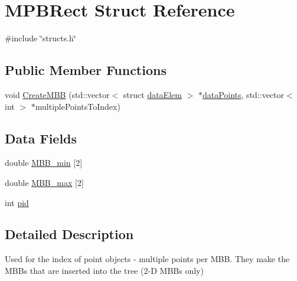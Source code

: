 \hypertarget{structMPBRect}{\section{M\-P\-B\-Rect Struct Reference}
\label{structMPBRect}
}


{\ttfamily \#include \char`\"{}structs.\-h\char`\"{}}

\subsection*{Public Member Functions}
\begin{DoxyCompactItemize}
\item 
void \hyperlink{structMPBRect_a033ab3752f265ead9537a7de070e074a}{Create\-M\-B\-B} (std\-::vector$<$ struct \hyperlink{structdataElem}{data\-Elem} $>$ $\ast$\hyperlink{globals_8h_ac152ac2be0eb07c2b73b4bb54a8f1952}{data\-Points}, std\-::vector$<$ int $>$ $\ast$multiple\-Points\-To\-Index)
\end{DoxyCompactItemize}
\subsection*{Data Fields}
\begin{DoxyCompactItemize}
\item 
double \hyperlink{structMPBRect_a87b98ecee53f4258063d5ba19fe04cad}{M\-B\-B\-\_\-min} \mbox{[}2\mbox{]}
\item 
double \hyperlink{structMPBRect_a1635c4ed1a66979dc1c0422a9baf7ce6}{M\-B\-B\-\_\-max} \mbox{[}2\mbox{]}
\item 
int \hyperlink{structMPBRect_a94c83296d1783e2b18c65016a0501645}{pid}
\end{DoxyCompactItemize}


\subsection{Detailed Description}
Used for the index of point objects -\/ multiple points per M\-B\-B. They make the M\-B\-Bs that are inserted into the tree (2-\/\-D M\-B\-Bs only) 

